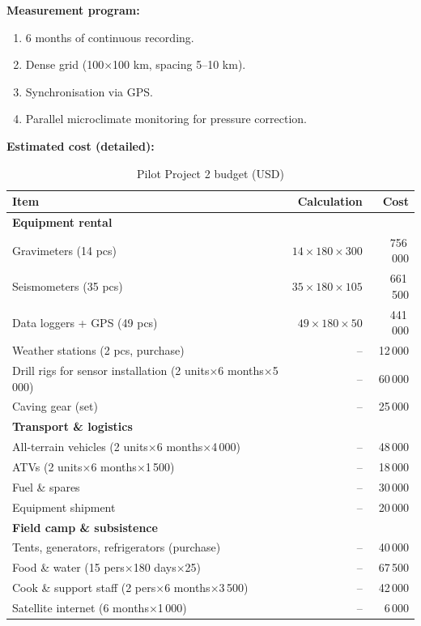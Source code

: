 \documentclass[12pt,a4paper]{article}
\theoremstyle{remark}
\begin{document}
	\textbf{Measurement program:}
	\begin{enumerate}
		\item 6 months of continuous recording.
		\item Dense grid (100$\times$100 km, spacing 5–10 km).
		\item Synchronisation via GPS.
		\item Parallel microclimate monitoring for pressure correction.
	\end{enumerate}
	
	\textbf{Estimated cost (detailed):}
	\begin{table}[htbp]
		\centering
		\caption{Pilot Project 2 budget (USD)}
		\label{tab:budget-karst}
		\small
		\begin{tabular}{lrr}
			\toprule
			\textbf{Item} & \textbf{Calculation} & \textbf{Cost} \\
			\midrule
			\multicolumn{3}{l}{\textbf{Equipment rental}} \\
			Gravimeters (14 pcs) & $14\times180\times300$ & 756\,000 \\
			Seismometers (35 pcs) & $35\times180\times105$ & 661\,500 \\
			Data loggers + GPS (49 pcs) & $49\times180\times50$ & 441\,000 \\
			Weather stations (2 pcs, purchase) & – & 12\,000 \\
			Drill rigs for sensor installation (2 units$\times$6 months$\times$5\,000) & – & 60\,000 \\
			Caving gear (set) & – & 25\,000 \\
			\multicolumn{3}{l}{\textbf{Transport \& logistics}} \\
			All‑terrain vehicles (2 units$\times$6 months$\times$4\,000) & – & 48\,000 \\
			ATVs (2 units$\times$6 months$\times$1\,500) & – & 18\,000 \\
			Fuel \& spares & – & 30\,000 \\
			Equipment shipment & – & 20\,000 \\
			\multicolumn{3}{l}{\textbf{Field camp \& subsistence}} \\
			Tents, generators, refrigerators (purchase) & – & 40\,000 \\
			Food \& water (15 pers$\times$180 days$\times$25) & – & 67\,500 \\
			Cook \& support staff (2 pers$\times$6 months$\times$3\,500) & – & 42\,000 \\
			Satellite internet (6 months$\times$1\,000) & – & 6\,000 \\

\end{tabular}
\end{table}
\end{document}
